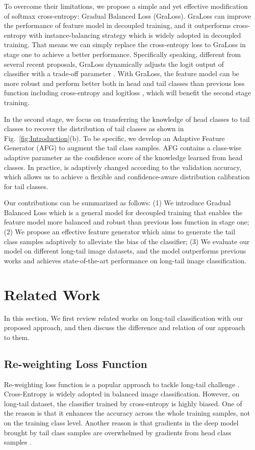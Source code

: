 \documentclass[runningheads]{llncs}
\begin{document}
To overcome their limitations, we propose a simple and yet effective modification of softmax cross-entropy: Gradual Balanced Loss (GraLoss). GraLoss can improve the performance of feature model in decoupled training, and it outperforms cross-entropy with instance-balancing strategy which is widely adopted in decoupled training. That means we can simply replace the cross-entropy loss to GraLoss in stage one to achieve a better performance. Specifically speaking, different from several recent proposals, GraLoss dynamically adjusts the logit output of classifier with a trade-off parameter . With GraLoss, the feature model can be more robust and perform better both in head and tail classes than previous loss function including cross-entropy and logitloss \cite{menon2020long}, which will benefit the second stage training. 

In the second stage, we focus on transferring the knowledge of head classes to tail classes to recover the distribution of tail classes as shown in Fig.~\ref{fig:Introduction}(b). To be specific, we develop an Adaptive Feature Generator (AFG) to augment the tail class samples. AFG contains a class-wise adaptive parameter  as the confidence score of the knowledge learned from head classes. In practice,  is adaptively changed according to the validation accuracy, which allows us to achieve a flexible and confidence-aware distribution calibration for tail classes. 

Our contributions can be summarized as follows: (1) We introduce Gradual Balanced Loss which is a general model for decoupled training that enables the feature model more balanced and robust than previous loss function in stage one; (2) We propose an effective feature generator which aims to generate the tail class samples adaptively to alleviate the bias of the classifier; (3) We evaluate our model on different long-tail image datasets, and the model outperforms previous works and achieves state-of-the-art performance on long-tail image classification.




\section{Related Work}
In this section, We first review related works on long-tail classification with our proposed approach, and then discuss the difference and relation of our approach to them.
\subsection{Re-weighting Loss Function}
Re-weighting loss function is a popular approach to tackle long-tail challenge \cite{cui2019class,cao2019learning,wu2020distribution,wang2021seesaw,tan2021equalization,ren2020balanced,menon2020long}. Cross-Entropy is widely adopted in balanced image classification. However, on long-tail dataset, the classifier trained by cross-entropy is highly biased. One of the reason is that it enhances the accuracy across the whole training samples, not on the training class level. Another reason is that gradients in the deep model brought by tail class samples are overwhelmed by gradients from head class samples \cite{wang2021seesaw}. 
\end{document}

